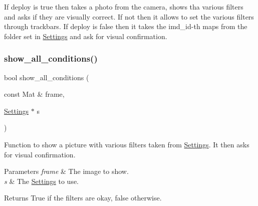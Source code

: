 If deploy is true then takes a photo from the camera, shows tha various filters and asks if they are visually correct. If not then it allows to set the various filters through trackbars. If deploy is false then it takes the imd\+\_\+id-\/th maps from the folder set in \mbox{\hyperlink{class_settings}{Settings}} and ask for visual confirmation. \mbox{\label{configure_8hh_a8d7a029347b3667c49a14ee9fb6fb0ad}} 
\subsubsection{\texorpdfstring{show\_all\_conditions()}{show\_all\_conditions()}}
{\footnotesize\ttfamily bool show\+\_\+all\+\_\+conditions (\begin{DoxyParamCaption}\item[{const Mat \&}]{frame,  }\item[{\mbox{\hyperlink{class_settings}{Settings}} $\ast$}]{s }\end{DoxyParamCaption})}

Function to show a picture with various filters taken from \mbox{\hyperlink{class_settings}{Settings}}. It then asks for visual confirmation.


\begin{DoxyParams}{Parameters}
{\em frame} & The image to show. \\
\hline
{\em s} & The \mbox{\hyperlink{class_settings}{Settings}} to use. \\
\hline
\end{DoxyParams}
\begin{DoxyReturn}{Returns}
True if the filters are okay, false otherwise. 
\end{DoxyReturn}
